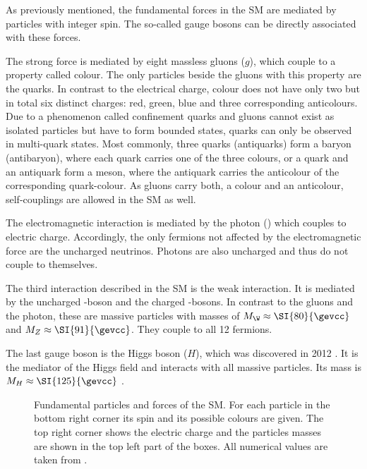 As previously mentioned, the fundamental forces in the \ac{SM} are mediated by particles with integer spin.
The so-called gauge bosons can be directly associated with these forces.

The strong force is mediated by eight massless gluons ($g$), which couple to a property called colour.
The only particles beside the gluons with this property are the quarks.
In contrast to the electrical charge, colour does not have only two but in total six distinct charges: red, green, blue and three corresponding anticolours.
Due to a phenomenon called confinement quarks and gluons cannot exist as isolated particles but have to form bounded states, \ie quarks can only be observed in multi-quark states.
Most commonly, three quarks (antiquarks) form a baryon (antibaryon), where each quark carries one of the three colours, or a quark and an antiquark form a meson, where the antiquark carries the anticolour of the corresponding quark-colour.
As gluons carry both, a colour and an anticolour, self-couplings are allowed in the \ac{SM} as well.

The electromagnetic interaction is mediated by the photon (\g) which couples to electric charge.
Accordingly, the only fermions not affected by the electromagnetic force are the uncharged neutrinos.
Photons are also uncharged and thus do not couple to themselves.

The third interaction described in the \ac{SM} is the weak interaction.
It is mediated by the uncharged \Z-boson and the charged \Wpm-bosons.
In contrast to the gluons and the photon, these are massive particles with masses of $M_\W\approx\SI{80}{\gevcc}$ and $M_Z\approx\SI{91}{\gevcc}$.
They couple to all \num{12} fermions.

The last gauge boson is the Higgs boson ($H$), which was discovered in \num{2012} \cite{Aad:2012tfa, Chatrchyan:2012xdj}.
It is the mediator of the Higgs field and interacts with all massive particles.
Its mass is $M_H\approx\SI{125}{\gevcc}$ \cite{PDG_2017}.

\begin{figure}[tbp]
	\centering
	
	\caption{Fundamental particles and forces of the \ac{SM}.
	For each particle in the bottom right corner its spin and its possible colours are given.
	The top right corner shows the electric charge and the particles masses are shown in the top left part of the boxes.
	All numerical values are taken from \cite{PDG_2017}.}
	\label{fig:SMparts}
\end{figure}


